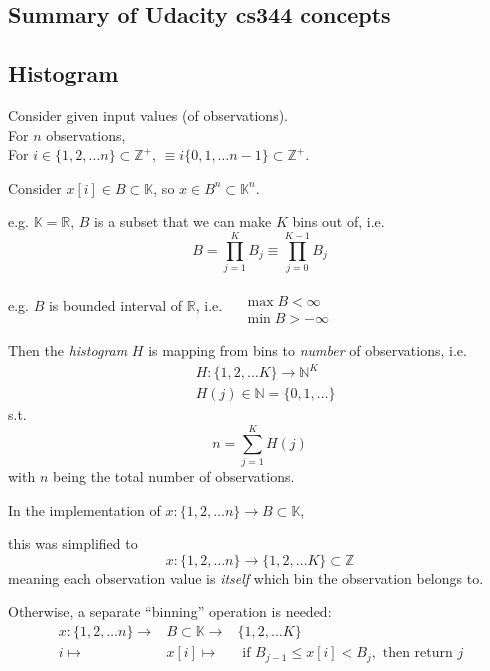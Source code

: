 \documentclass[10pt]{amsart}
\begin{document}
\begin{multicols*}{2}
\section{Summary of Udacity cs344 concepts}

\subsection{Histogram}

Consider given input values (of observations).  \\
For $n$ observations, \\
For $i\in \lbrace 1,2, \dots n \rbrace \subset \mathbb{Z}^+$, $\equiv i \lbrace 0 , 1, \dots n-1 \rbrace \subset \mathbb{Z}^+$.

Consider $x[i] \in B\subset \mathbb{K}$, so $x\in B^n \subset \mathbb{K}^n$.

e.g. $\mathbb{K} = \mathbb{R}$, $B$ is a subset that we can make $K$ bins out of, i.e.
\[
B = \prod_{j=1}^K B_j \equiv \prod_{j=0}^{K-1}B_j
\]

e.g. $B$ is bounded interval of $\mathbb{R}$, i.e. $\begin{aligned} & \quad \\
  & \max{ B} < \infty \\
  & \min{ B } > -\infty \end{aligned}$

Then the \emph{histogram} $H$ is mapping from bins to \emph{number} of observations, i.e.
\begin{equation}
  \begin{aligned}
    & H:\lbrace 1 , 2, \dots K \rbrace \to \mathbb{N}^K \\ 
    & H(j) \in \mathbb{N} = \lbrace 0,1, \dots \rbrace
    \end{aligned}
  \end{equation}
s.t.
\begin{equation}
  \boxed{ n  = \sum_{j=1}^K H(j) }
\end{equation}
with $n$ being the total number of observations.

In the implementation of $x:\lbrace 1 , 2, \dots n \rbrace \to B \subset \mathbb{K}$,

this was simplified to
\[
x:\lbrace 1 , 2, \dots n \rbrace \to \lbrace 1,2, \dots K \rbrace \subset \mathbb{Z}
\]
meaning each observation value is \emph{itself} which bin the observation belongs to.

Otherwise, a separate ``binning'' operation is needed:
\begin{equation}
  \begin{aligned}
    & x: \lbrace 1 , 2, \dots n \rbrace \to & B \subset \mathbb{K} \to & \lbrace 1,2, \dots K \rbrace \\ 
    & i \mapsto & x[i]  \mapsto & \text{ if } B_{j-1} \leq x[i] < B_j , \text{ then return $j$ }
    \end{aligned}
  \end{equation}


\end{multicols*}
\end{document}
